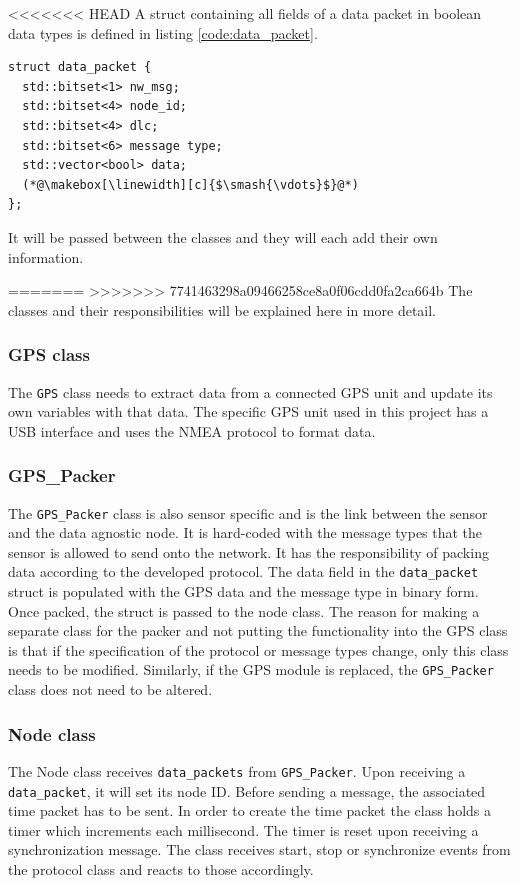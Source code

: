 <<<<<<< HEAD
A struct containing all fields of a data packet in boolean data types is defined in listing \ref{code:data_packet}.  

\begin{lstlisting}[caption=Struct for data packet.,label=code:data_packet]
struct data_packet {
  std::bitset<1> nw_msg;
  std::bitset<4> node_id;
  std::bitset<4> dlc;
  std::bitset<6> message type;
  std::vector<bool> data; 
  (*@\makebox[\linewidth][c]{$\smash{\vdots}$}@*)
};
\end{lstlisting}
It will be passed between the classes and they will each add their own information. 

=======
>>>>>>> 7741463298a09466258ce8a0f06cdd0fa2ca664b
The classes and their responsibilities will be explained here in more detail.

\subsubsection*{GPS class}
The \texttt{GPS} class needs to extract data from a connected GPS unit and update its own variables with that data.
The specific GPS unit used in this project has a USB interface and uses the NMEA protocol to format data.

\subsubsection*{GPS\_Packer}
The \texttt{GPS\_Packer} class is also sensor specific and is the link between the sensor and the data agnostic node.
It is hard-coded with the message types that the sensor is allowed to send onto the network.
It has the responsibility of packing data according to the developed protocol.
The data field in the \texttt{data\_packet} struct is populated with the GPS data and the message type in binary form.
Once packed, the struct is passed to the node class.
The reason for making a separate class for the packer and not putting the functionality into the GPS class is that if the specification of the protocol or message types change, only this class needs to be modified.
Similarly, if the GPS module is replaced, the \texttt{GPS\_Packer} class does not need to be altered.

\subsubsection*{Node class}
The Node class receives \texttt{data\_packets} from \texttt{GPS\_Packer}.
Upon receiving a \texttt{data\_packet}, it will set its node ID.
Before sending a message, the associated time packet has to be sent.
In order to create the time packet the class holds a timer which increments each millisecond.
The timer is reset upon receiving a synchronization message.
The class receives start, stop or synchronize events from the protocol class and reacts to those accordingly.

